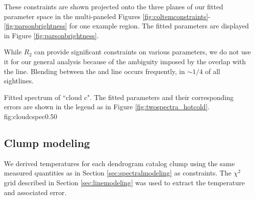 These constraints are shown projected onto the three planes of our fitted
parameter space in the multi-paneled Figures
\ref{fig:coltemconstraints}-\ref{fig:parsonbrightness} for one example region.
The fitted parameters are displayed in Figure \ref{fig:parsonbrightness}.

While $R_2$ can provide significant constraints on various parameters, we do
not use it for our general analysis because of the ambiguity imposed by the
overlap with the \methanol \fourtwotwo line.  Blending between the \methanol
\fourtwotwo and \formaldehyde \threetwotwo line occurs frequently, in $\sim1/4$
of all sightlines.



{Fitted spectrum of ``cloud c".  The fitted parameters and their corresponding
errors are shown in the legend as in Figure \ref{fig:twospectra_hotcold}.}
{fig:cloudcspec}{0.5}{0}



\subsection{Clump modeling}
\label{sec:dendromod}
We derived temperatures for each dendrogram catalog clump using the same
measured quantities as in Section \ref{sec:spectralmodeling} as constraints.
The $\chi^2$ grid described in Section \ref{sec:linemodeling} was used to
extract the temperature and associated error.

